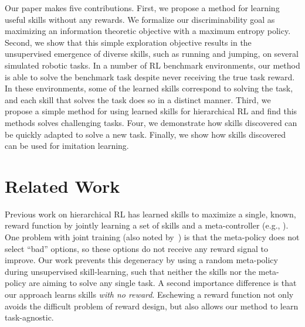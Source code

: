 \documentclass{article} %
\theoremstyle{questionstyle}\newtheorem{question}{Question}
\begin{document}
Our paper makes five contributions.
First, we propose a method for learning useful skills without any rewards. We formalize our discriminability goal as maximizing an information theoretic objective with a maximum entropy policy.
Second, we show that this simple exploration objective results in the unsupervised emergence of diverse skills, such as running and jumping, on several simulated robotic tasks. In a number of RL benchmark environments, our method is able to solve the benchmark task despite never receiving the true task reward. In these environments, some of the learned skills correspond to solving the task, and each skill that solves the task does so in a distinct manner.
Third, we propose a simple method for using learned skills for hierarchical RL and find this methods solves challenging tasks.
Four, we demonstrate how skills discovered can be quickly adapted to solve a new task.
Finally, we show how skills discovered can be used for imitation learning.

\section{Related Work}

Previous work on hierarchical RL has learned skills to maximize a single, known, reward function by jointly learning a set of skills and a meta-controller (e.g., \citep{bacon2017option, heess2016learning, dayan1993feudal, frans2017meta, krishnan2017ddco, florensa2017stochastic}). One problem with joint training (also noted by~\citet{shazeer2017outrageously}) is that the meta-policy does not select ``bad'' options, so these options do not receive any reward signal to improve. Our work prevents this degeneracy by using a random meta-policy during unsupervised skill-learning, such that neither the skills nor the meta-policy are aiming to solve any single task.
A second importance difference is that our approach learns skills \emph{with no reward}. Eschewing a reward function not only avoids the difficult problem of reward design, but also allows our method to learn task-agnostic.
\end{document}
